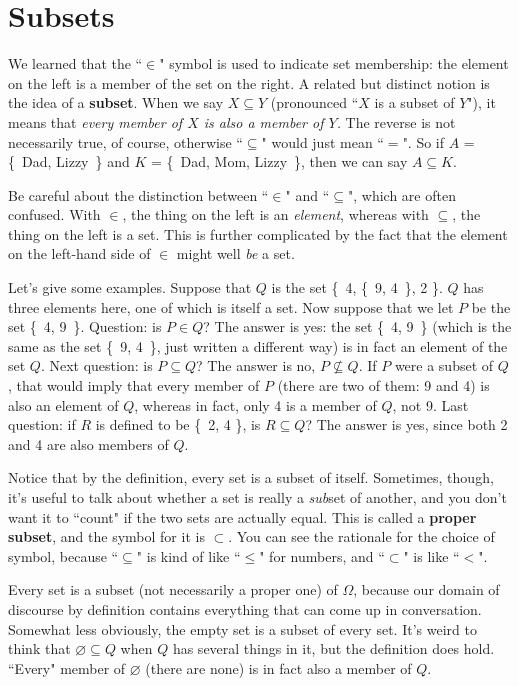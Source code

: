\section{Subsets}

We learned that the ``$\in$" symbol is used to indicate set membership: the
element on the left is a member of the set on the right. A related but
distinct notion is the idea of a \textbf{subset}.  When we
say $X \subseteq Y$ (pronounced ``$X$ is a subset of $Y$"), it means that
\textit{every member of $X$ is also a member of $Y$.} The reverse is not
necessarily true, of course, otherwise ``$\subseteq$" would just mean
``$=$". So if $A$ = \{~Dad, Lizzy~\} and $K$ = \{~Dad, Mom, Lizzy~\},
then we can say $A \subseteq K$.

Be careful about the distinction between ``$\in$" and ``$\subseteq$", which
are often confused. With $\in$, the thing on the left is an
\textit{element},  whereas with $\subseteq$, the thing on the left is a set.
This is further complicated by the fact that the element on the left-hand
side of $\in$ might well \textit{be} a set.

Let's give some examples. Suppose that $Q$ is the set \{~4, \{~9, 4~\}, 2
\}. $Q$ has three elements here, one of which is itself a set. Now suppose
that we let $P$ be the set \{~4, 9~\}. Question: is $P \in Q$? The answer
is yes: the set \{~4, 9~\} (which is the same as the set \{~9, 4~\}, just
written a different way) is in fact an element of the set $Q$. Next
question: is $P \subseteq Q$? The answer is no, $P \not\subseteq Q$. If $P$
were a subset of $Q$, that would imply that every member of $P$ (there are
two of them: 9 and 4) is also an element of $Q$, whereas in fact, only 4
is a member of $Q$, not 9. Last question: if $R$ is defined to be \{~2, 4
\}, is $R \subseteq Q$? The answer is yes, since both 2 and 4 are also
members of $Q$.

Notice that by the definition, every set is a subset of itself. Sometimes,
though, it's useful to talk about whether a set is really a \textit{sub}set
of another, and you don't want it to ``count" if the two sets are actually
equal. This is called a \textbf{proper subset},  and
the symbol for it is $\subset$. You can see the rationale for the choice of
symbol, because ``$\subseteq$" is kind of like ``$\leq$" for numbers, and
``$\subset$" is like ``$<$".

Every set is a subset (not necessarily a proper one) of $\Omega$, because
our domain of discourse  by
definition contains everything that can come up in conversation. Somewhat
less obviously, the empty set  is a subset of every set.
It's weird to think that $\varnothing \subseteq Q$ when $Q$ has several
things in it, but the definition does hold. ``Every" member of
$\varnothing$ (there are none) is in fact also a member of $Q$.

